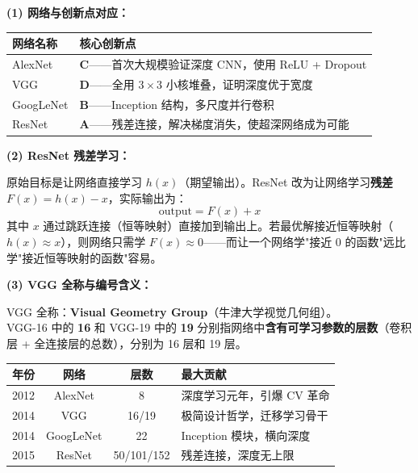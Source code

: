 \documentclass[a4paper,11pt]{ctexart}
\begin{document}
\begin{solutionbox}[参考答案与详细解析]
    \textbf{(1) 网络与创新点对应：}

    \begin{center}
    \begin{tabular}{p{2.8cm} p{9cm}}
        \toprule
        网络名称 & 核心创新点 \\
        \midrule
        AlexNet & \textbf{C}——首次大规模验证深度 CNN，使用 ReLU + Dropout \\
        VGG & \textbf{D}——全用 $3\times3$ 小核堆叠，证明深度优于宽度 \\
        GoogLeNet & \textbf{B}——Inception 结构，多尺度并行卷积 \\
        ResNet & \textbf{A}——残差连接，解决梯度消失，使超深网络成为可能 \\
        \bottomrule
    \end{tabular}
    \end{center}

    \vspace{0.5em}
    \textbf{(2) ResNet 残差学习：}

    原始目标是让网络直接学习 $h(x)$（期望输出）。ResNet 改为让网络学习\textbf{残差} $F(x) = h(x) - x$，实际输出为：
    \begin{equation}
        \text{output} = F(x) + x
    \end{equation}
    其中 $x$ 通过跳跃连接（恒等映射）直接加到输出上。若最优解接近恒等映射（$h(x) \approx x$），则网络只需学 $F(x) \approx 0$——而让一个网络学"接近 0 的函数"远比学"接近恒等映射的函数"容易。

    \vspace{0.5em}
    \textbf{(3) VGG 全称与编号含义：}

    VGG 全称：\textbf{Visual Geometry Group}（牛津大学视觉几何组）。\\
    VGG-16 中的 \textbf{16} 和 VGG-19 中的 \textbf{19} 分别指网络中\textbf{含有可学习参数的层数}（卷积层 + 全连接层的总数），分别为 16 层和 19 层。

    \begin{keybox}[四大里程碑总结时间线]
        \begin{center}
        \begin{tabular}{cccl}
            \toprule
            年份 & 网络 & 层数 & 最大贡献 \\
            \midrule
            2012 & AlexNet & 8 & 深度学习元年，引爆 CV 革命 \\
            2014 & VGG & 16/19 & 极简设计哲学，迁移学习骨干 \\
            2014 & GoogLeNet & 22 & Inception 模块，横向深度 \\
            2015 & ResNet & 50/101/152 & 残差连接，深度无上限 \\
            \bottomrule
        \end{tabular}
        \end{center}
    \end{keybox}
\end{solutionbox}
\end{document}
